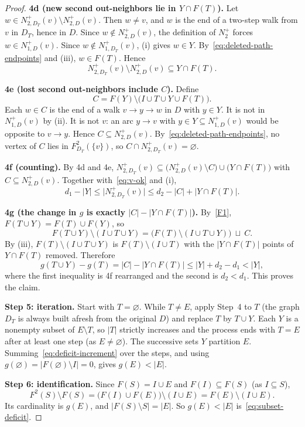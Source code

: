 \documentclass[11pt]{article}
\theoremstyle{remark}
\newcommand{\abs}[1]{\lvert #1\rvert}
\newcommand{\step}[1]{\par\medskip\noindent\textbf{#1}\enspace}
\begin{document}
\begin{proof}
\step{4d (new second out-neighbors lie in $Y\cap F(T)$).}
Let $w\in N_{2,D_T}^+(v)\setminus N_{2,D}^+(v)$.  Then $w\ne v$, and $w$ is
the end of a two-step walk from $v$ in $D_T$, hence in $D$.  Since
$w\notin N^+_{2,D}(v)$, the definition of $N_2^+$ forces
$w\in N^+_{1,D}(v)$.  Since $w\notin N^+_{1,D_T}(v)$, (i) gives $w\in Y$.
By~\eqref{eq:deleted-path-endpoints} and (iii), $w\in F(T)$.  Hence
\[
 N_{2,D_T}^+(v)\setminus N_{2,D}^+(v)\subseteq Y\cap F(T).
\]

\step{4e (lost second out-neighbors include $C$).}
Define
\[
  C=F(Y)\setminus\bigl(I\cup T\cup Y\cup F(T)\bigr).
\]
Each $w\in C$ is the end of a walk $v\to y\to w$ in $D$ with $y\in Y$.
It is not in $N^+_{1,D}(v)$ by (ii).  It is not $v$: an arc $y\to v$ with
$y\in Y\subseteq N^+_{1,D}(v)$ would be opposite to $v\to y$.
Hence $C\subseteq N_{2,D}^+(v)$.  By~\eqref{eq:deleted-path-endpoints},
no vertex of $C$ lies in $F^2_{D_T}(\{v\})$, so
$C\cap N_{2,D_T}^+(v)=\varnothing$.

\step{4f (counting).}
By 4d and 4e,
$N^+_{2,D_T}(v)\subseteq\bigl(N^+_{2,D}(v)\setminus C\bigr)\cup
\bigl(Y\cap F(T)\bigr)$ with $C\subseteq N^+_{2,D}(v)$.
Together with~\eqref{eq:v-ok} and (i),
\[
  d_1-\abs{Y}
  \le \abs{N_{2,D_T}^+(v)}
  \le d_2-\abs{C}+\abs{Y\cap F(T)}.
\]

\step{4g (the change in $g$ is exactly $\abs C-\abs{Y\cap F(T)}$).}
By~\ref{F1}, $F(T\cup Y)=F(T)\cup F(Y)$, so
\[
 F(T\cup Y)\setminus(I\cup T\cup Y)
 =\bigl(F(T)\setminus(I\cup T\cup Y)\bigr)\ \sqcup\ C .
\]
By (iii), $F(T)\setminus(I\cup T\cup Y)$ is $F(T)\setminus(I\cup T)$ with the
$\abs{Y\cap F(T)}$ points of $Y\cap F(T)$ removed.  Therefore
\[
  g(T\cup Y)-g(T)
  =\abs{C}-\abs{Y\cap F(T)}
  \le \abs{Y}+d_2-d_1
  <\abs{Y},
\]
where the first inequality is 4f rearranged and the second is $d_2<d_1$.
This proves the claim.

\step{Step 5: iteration.}
Start with $T=\varnothing$.  While $T\ne E$, apply Step~4 to $T$ (the graph
$D_T$ is always built afresh from the original $D$) and replace $T$ by
$T\cup Y$.  Each $Y$ is a nonempty subset of $E\setminus T$, so $\abs T$
strictly increases and the process ends with $T=E$ after at least one step
(as $E\neq\varnothing$).  The successive sets $Y$ partition $E$.
Summing~\eqref{eq:deficit-increment} over the steps, and using
$g(\varnothing)=\abs{F(\varnothing)\setminus I}=0$, gives $g(E)<\abs{E}$.

\step{Step 6: identification.}
Since $F(S)=I\cup E$ and $F(I)\subseteq F(S)$ (as $I\subseteq S$),
\[
  F^2(S)\setminus F(S)
  =\bigl(F(I)\cup F(E)\bigr)\setminus(I\cup E)
  =F(E)\setminus(I\cup E).
\]
Its cardinality is $g(E)$, and $\abs{F(S)\setminus S}=\abs E$.  So
$g(E)<\abs E$ is~\eqref{eq:subset-deficit}.
\end{proof}
\end{document}
